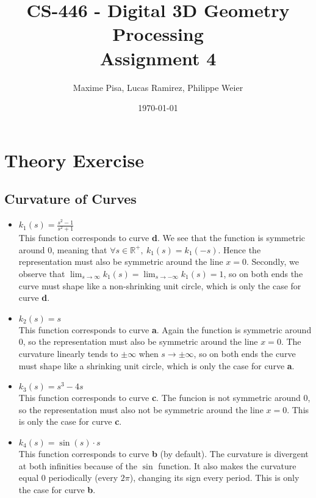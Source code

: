 \documentclass{article}
\title{CS-446 - Digital 3D Geometry Processing\\Assignment 4}
\author{Maxime Pisa, Lucas Ramirez, Philippe Weier}
\date{\today}
\theoremstyle{definition}
\theoremstyle{definition}
\theoremstyle{definition}
\begin{document}
\maketitle

\section{Theory Exercise}
\subsection{Curvature of Curves}
\begin{itemize}
\item $k_1(s)=\frac{s^2-1}{s^2+1}$\\

This function corresponds to curve \textbf{d}. We see that the function is symmetric around 0, meaning that $\forall s\in\mathbb{R}^+, \ k_1(s)=k_1(-s)$. Hence the representation must also be symmetric around the line $x=0$. Secondly, we observe that $\lim_{s\rightarrow\infty} k_1(s) = \lim_{s\rightarrow - \infty} k_1(s) = 1$, so on both ends the curve must shape like a non-shrinking unit circle, which is only the case for curve \textbf{d}.
\item $k_2(s)=s$\\

This function corresponds to curve \textbf{a}. Again the function is symmetric around 0, so the representation must also be symmetric around the line $x=0$. The curvature linearly tends to $\pm \infty$ when $s\rightarrow\pm\infty$, so on both ends the curve must shape like a shrinking unit circle, which is only the case for curve \textbf{a}.
\item $k_3(s)=s^3-4s$\\

This function corresponds to curve \textbf{c}. The funcion is not symmetric around 0, so the representation  must also not be symmetric around the line $x=0$. This is only the case for curve \textbf{c}.
\item $k_4(s)=\sin(s)\cdot s$\\

This function corresponds to curve \textbf{b} (by default). The curvature is divergent at both infinities because of the $\sin$ function. It also makes the curvature equal 0 periodically (every $2\pi$), changing its sign every period. This is only the case for curve \textbf{b}.
\end{itemize}
\end{document}
